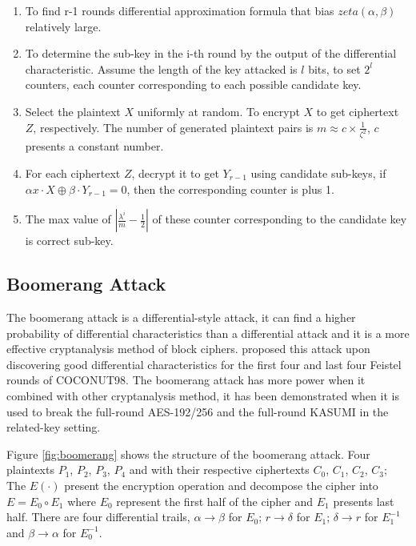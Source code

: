 \begin{enumerate}
    \item To find r-1 rounds differential approximation formula that bias $zeta(\alpha, \beta)$ relatively large.
    \item To determine the sub-key in the i-th round by the output of the differential characteristic. Assume the length of the key attacked is $l$ bits, to set $2^l$ counters, each counter corresponding to each possible candidate key.
    \item Select the plaintext $X$ uniformly at random. To encrypt $X$ to get ciphertext $Z$, respectively. The number of generated plaintext pairs is $m \approx c \times \frac{1}{\zeta^2}$, $c$ presents a constant number.
    \item For each ciphertext $Z$, decrypt it to get $Y_{r-1}$ using candidate sub-keys, if $\alpha x\cdot X\oplus \beta \cdot Y_{r-1}=0$, then the corresponding counter is plus 1.
    \item The max value of $|\frac{\lambda^i}{m}-\frac{1}{2}|$ of these counter corresponding to the candidate key is correct sub-key.
\end{enumerate}

\subsection{Boomerang Attack}
The boomerang attack is a differential-style attack, it can find a higher probability of differential characteristics than a differential attack and it is a more effective cryptanalysis method of block ciphers. \cite{10.1007/3-540-48519-8_12} proposed this attack upon discovering good differential characteristics for the first four and last four Feistel rounds of COCONUT98. The boomerang attack has more power when it combined with other cryptanalysis method, it has been demonstrated when it is used to break the full-round AES-192/256 \cite{biryukov2009related} and the full-round KASUMI \cite{biham2005related} in the related-key setting.


Figure \ref{fig:boomerang} shows the structure of the boomerang attack. Four plaintexts $P_1$, $P_2$, $P_3$, $P_4$ and with their respective ciphertexts $C_0$, $C_1$, $C_2$, $C_3$; The $E(\cdot)$ present the encryption operation and decompose the cipher into $E=E_0 \circ E_1$ where $E_0$ represent the first half of the cipher and $E_1$ presents last half. There are four differential trails, $\alpha\to \beta$ for $E_0$; $r\to\delta$ for $E_1$; $\delta \to r$ for $E_1^{-1}$ and $\beta\to\alpha$ for $E_0^{-1}$.

